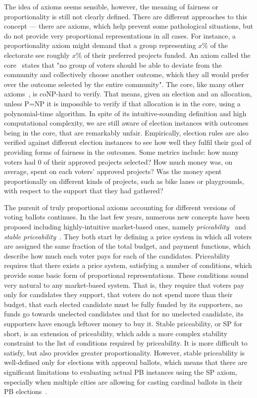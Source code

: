 The idea of axioms seems sensible, however, the meaning of fairness or proportionality is still not clearly defined. There are different approaches to this concept --- there are axioms, which help prevent some pathological situations, but do not provide very proportional representations in all cases. For instance, a proportionality axiom might demand that a group representing $x\%$ of the electorate see roughly $x\%$ of their preferred projects funded. An axiom called the core~\cite{AzizEtAl} states that "no group of voters should be able to deviate from the community and collectively choose another outcome, which they all would prefer over the outcome selected by the entire community". The core, like many other axioms~\cite{AzizEtAlComplexity}, is coNP-hard to verify. That means, given an election and an allocation, unless P=NP it is impossible to verify if that allocation is in the core, using a polynomial-time algorithm. In spite of its intuitive-sounding definition and high computational complexity, we are still aware of election instances with outcomes being in the core, that are remarkably unfair.  Empirically, election rules are also verified against different election instances to see how well they fulfil their goal of providing forms of fairness in the outcomes. Some metrics include: how many voters had $0$ of their approved projects selected? How much money was, on average, spent on each voters' approved projects? Was the money spent proportionally on different kinds of projects, such as bike lanes or playgrounds, with respect to the support that they had gathered?

The pursuit of truly proportional axioms accounting for different versions of voting ballots continues. In the last few years, numerous new concepts have been proposed including highly-intuitive market-based ones, namely \emph{priceability}~\cite{ProportionalityAndLimits} and \emph{stable priceability}~\cite{MarketBased}. They both start by defining a price system in which all voters are assigned the same fraction of the total budget, and payment functions, which describe how much each voter pays for each of the candidates. Priceability requires that there exists a price system, satisfying a number of conditions, which provide some basic form of proportional representations. These conditions sound very natural to any market-based system. That is, they require that voters pay only for candidates they support, that voters do not spend more than their budget, that each elected candidate must be fully funded by its supporters, no funds go towards unelected candidates and that for no unelected candidate, its supporters have enough leftover money to buy it. Stable priceability, or SP for short, is an extension of priceability, which adds a more complex stability constraint to the list of conditions required by priceability. It is more difficult to satisfy, but also provides greater proportionality. However, stable priceability is well-defined only for elections with approval ballots, which means that there are significant limitations to evaluating actual PB instances using the SP axiom, especially when multiple cities are allowing for casting cardinal ballots in their PB elections~\cite{StrasbourgBallots, ToulouseBallots, GdanskBallots}.

